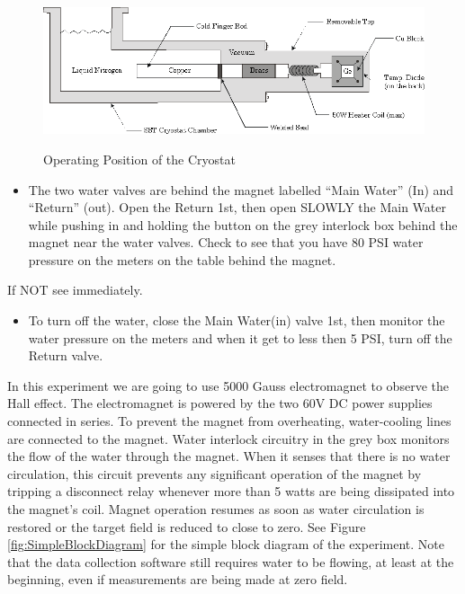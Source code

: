 \documentclass{../lab}
\begin{document}
\begin{figure}[h]
    \centering
    \href{http://experimentationlab.berkeley.edu/sites/default/files/images/SHEimage100.gif}{\includegraphics[width=0.7\linewidth]{images/SHEimage100.png}}
    \caption{Operating Position of the Cryostat}
    \label{fig:OperatingPositionOfCryostat}
\end{figure}

\begin{itemize}
    \item The two water valves are behind the magnet labelled ``Main Water'' (In) and ``Return'' (out). Open the Return 1st, then open SLOWLY the Main Water while pushing in and holding the button on the grey interlock box behind the magnet near the water valves. Check to see that you have 80 PSI water pressure on the meters on the table behind the magnet.
\end{itemize}

If NOT see \LabEngineer  immediately.

\begin{itemize}
    \item To turn off the water, close the Main Water(in) valve 1st, then monitor the water pressure on the meters and when it get to less then 5 PSI, turn off the Return valve.
\end{itemize}

In this experiment we are going to use 5000 Gauss electromagnet to observe the Hall effect. The electromagnet is powered by the two 60V DC power supplies connected in series. To prevent the magnet from overheating, water-cooling lines are connected to the magnet. Water interlock circuitry in the grey box monitors the flow of the water through the magnet. When it senses that there is no water circulation, this circuit prevents any significant operation of the magnet by tripping a disconnect relay whenever more than 5 watts are being dissipated into the magnet's coil. Magnet operation resumes as soon as water circulation is restored or the target field is reduced to close to zero. See Figure \ref{fig:SimpleBlockDiagram} for the simple block diagram of the experiment. Note that the data collection software still requires water to be flowing, at least at the beginning, even if measurements are being made at zero field.
\end{document}
